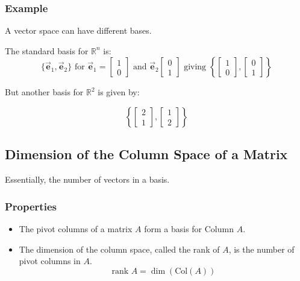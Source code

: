 \documentclass[12pt, landscape, twocolumn]{article}
\let\oldvec\vec
\renewcommand{\vec}[1]{\oldvec{\mathbf{ #1 } } }                    %
\begin{document}
        \subsubsection{Example}
        A vector space can have different bases.

        The standard basis for $\mathbb{R}^n$ is:
        \[
        \{\vec{e}_1, \vec{e}_2\} \text{ for } \vec{e}_1 =
        \left[ \begin{array}{c}
        1\\
        0
        \end{array}\right] \text{ and } \vec{e}_2
        \left[ \begin{array}{c}
        0\\
        1
        \end{array}\right] \text{ giving }
        \left\{ \left[ \begin{array}{c}
        1\\
        0
        \end{array}\right],
        \left[ \begin{array}{c}
        0\\
        1
        \end{array}\right]\right\}
        \]

        But another basis for $\mathbb{R}^2$ is given by:

        \[
        \left\{ \left[ \begin{array}{c}
        2\\
        1
        \end{array}\right],
        \left[ \begin{array}{c}
        1\\
        2
        \end{array}\right]\right\}
        \]
    \subsection{Dimension of the Column Space of a Matrix}
    Essentially, the number of vectors in a basis.

        \subsubsection{Properties}
        \begin{itemize}
            \item The pivot columns of a matrix $A$ form a basis for Column $A$.
            \item The dimension of the column space, called the rank of $A$, is the number of pivot columns in $A$.
                \[
                    \text{rank } A = \dim(\text{Col}(A))
                \]
        \end{itemize}
\end{document}
